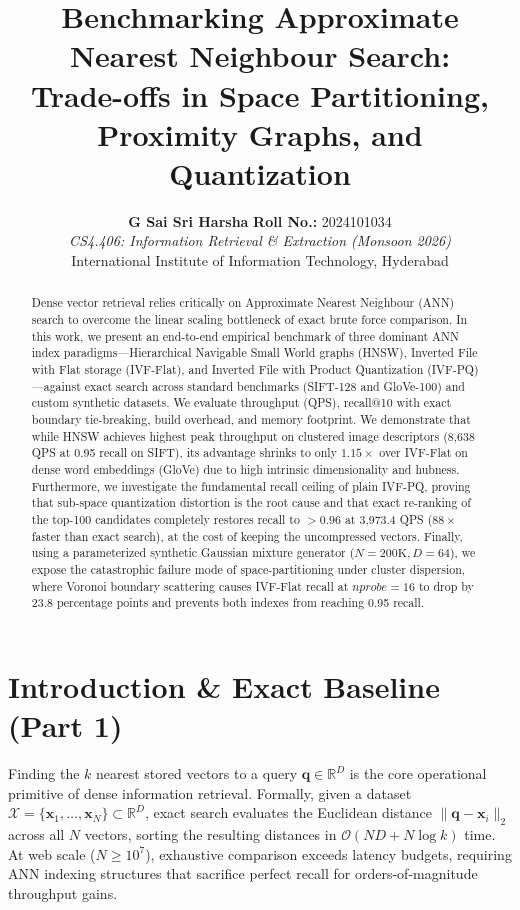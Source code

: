 \documentclass[10pt,twocolumn,a4paper]{article}
\title{\textbf{\Large Benchmarking Approximate Nearest Neighbour Search:\\Trade-offs in Space Partitioning, Proximity Graphs, and Quantization}}
\author{%
  \textbf{G Sai Sri Harsha} \quad \textbf{Roll No.:} 2024101034 \\
  \textit{CS4.406: Information Retrieval \& Extraction (Monsoon 2026)} \\
  International Institute of Information Technology, Hyderabad
}
\date{\vspace{-1.5em}}
\begin{document}
\maketitle

\begin{abstract}
Dense vector retrieval relies critically on Approximate Nearest Neighbour (ANN) search to overcome the linear scaling bottleneck of exact brute force comparison. In this work, we present an end-to-end empirical benchmark of three dominant ANN index paradigms---Hierarchical Navigable Small World graphs (HNSW), Inverted File with Flat storage (IVF-Flat), and Inverted File with Product Quantization (IVF-PQ)---against exact search across standard benchmarks (SIFT-128 and GloVe-100) and custom synthetic datasets. We evaluate throughput (QPS), recall@10 with exact boundary tie-breaking, build overhead, and memory footprint. We demonstrate that while HNSW achieves highest peak throughput on clustered image descriptors (8,638 QPS at 0.95 recall on SIFT), its advantage shrinks to only $1.15\times$ over IVF-Flat on dense word embeddings (GloVe) due to high intrinsic dimensionality and hubness. Furthermore, we investigate the fundamental recall ceiling of plain IVF-PQ, proving that sub-space quantization distortion is the root cause and that exact re-ranking of the top-100 candidates completely restores recall to $>0.96$ at 3,973.4 QPS ($88\times$ faster than exact search), at the cost of keeping the uncompressed vectors. Finally, using a parameterized synthetic Gaussian mixture generator ($N=200\text{K}, D=64$), we expose the catastrophic failure mode of space-partitioning under cluster dispersion, where Voronoi boundary scattering causes IVF-Flat recall at $nprobe=16$ to drop by 23.8 percentage points and prevents both indexes from reaching 0.95 recall.
\end{abstract}

\section{Introduction \& Exact Baseline (Part 1)}
Finding the $k$ nearest stored vectors to a query $\mathbf{q} \in \mathbb{R}^D$ is the core operational primitive of dense information retrieval. Formally, given a dataset $\mathcal{X} = \{\mathbf{x}_1, \dots, \mathbf{x}_N\} \subset \mathbb{R}^D$, exact search evaluates the Euclidean distance $\|\mathbf{q} - \mathbf{x}_i\|_2$ across all $N$ vectors, sorting the resulting distances in $\mathcal{O}(ND + N \log k)$ time. At web scale ($N \ge 10^7$), exhaustive comparison exceeds latency budgets, requiring ANN indexing structures that sacrifice perfect recall for orders-of-magnitude throughput gains.
\end{document}
